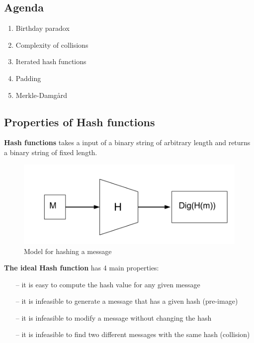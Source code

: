 

\subsection*{Agenda}
\begin{enumerate}
\item Birthday paradox
\item Complexity of collisions
\item Iterated hash functions
\item Padding
\item Merkle-Damgård
\end{enumerate}
\subsection{Properties of Hash functions}

\textbf{Hash functions} takes a input of a binary string of arbitrary
length and returns a binary string of fixed length.
\begin{figure}[H]
  \centering
  \includegraphics[scale=0.4]{images/10-hash}
  \caption{Model for hashing a message}
\end{figure}

\textbf{The ideal Hash function} has 4 main properties:
\begin{itemize}
\item [--]it is easy to compute the hash value for any given message
\item [--]it is infeasible to generate a message that has a given hash (pre-image)
\item [--]it is infeasible to modify a message without changing the hash
\item [--]it is infeasible to find two different messages with the same hash (collision)
\end{itemize}

